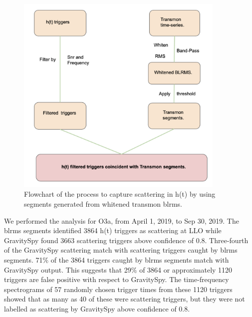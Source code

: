 \documentclass[12pt]{iopart}
\begin{document}
\quad
\begin{figure}[h]
    \centering
    \includegraphics[width=10cm]{flow.png}
    \caption{Flowchart of the process to capture scattering in h(t) by using segments generated from whitened transmon blrms.}
    \label{fig:flow}
\end{figure}











We performed the analysis for O3a, from April 1, 2019, to Sep 30, 2019. The blrms segments identified 3864 h(t) triggers as scattering at LLO while GravitySpy found 3663 scattering triggers above confidence of 0.8.  Three-fourth of the GravitySpy scattering match with scattering triggers caught by blrms segments. 71$\%$ of the 3864 triggers caught by blrms segments match with GravitySpy output. This suggests that 29$\%$ of 3864 or approximately 1120 triggers are false positive with respect to GravitySpy. 
The time-frequency spectrograms of 57 randomly chosen trigger times from these 1120 triggers showed that as many as 40 of these were scattering triggers, but they were not labelled as scattering by GravitySpy above confidence of 0.8. 
\end{document}
